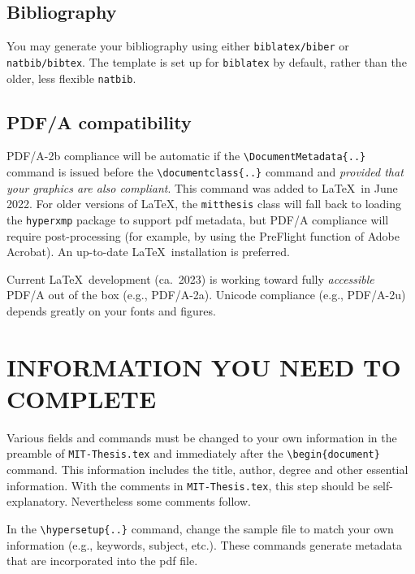 \documentclass[11pt]{article}
\begin{document}
\subsection*{Bibliography}
You may generate your bibliography using either \texttt{biblatex/biber} or \texttt{natbib/bibtex}.  The template is set up for \texttt{biblatex} by default, rather than the older, less flexible \texttt{natbib}.

\subsection*{PDF/A compatibility}
PDF/A-2b compliance will be automatic if the \verb|\DocumentMetadata{..}| command is issued before the \verb|\documentclass{..}| command and \textit{provided that your graphics are also compliant}. This command was added to \LaTeX\ in June 2022. For older versions of \LaTeX, the \texttt{mitthesis} class will fall back to loading the \texttt{hyperxmp} package to support pdf metadata, but PDF/A compliance will require post-processing (for example, by using the PreFlight function of Adobe Acrobat). An up-to-date \LaTeX\ installation is preferred.

Current \LaTeX\ development (ca.~2023) is working toward fully \textit{accessible} PDF/A out of the box (e.g., PDF/A-2a). Unicode compliance (e.g., PDF/A-2u) depends greatly on your fonts and figures.


\section*{INFORMATION YOU NEED TO COMPLETE}
Various fields and commands must be changed to your own information in the preamble of \texttt{MIT-Thesis.tex} and immediately after the \verb|\begin{document}| command. This information includes the title, author, degree and other essential information.  With the comments in \texttt{MIT-Thesis.tex}, this step should be self-explanatory. Nevertheless some comments follow.

In the \verb|\hypersetup{..}| command, change the sample file to match your own information (e.g., keywords, subject, etc.). These commands generate metadata that are incorporated into the pdf file.  
\end{document}
